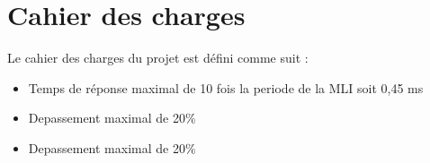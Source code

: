 \section{Cahier des charges}
Le cahier des charges du projet est défini comme suit :
\begin{itemize}
    \item Temps de réponse maximal de 10 fois la periode de la MLI soit 0,45 ms
    \item Depassement maximal de 20\%
\end{itemize}

\begin{itemize}
    \item Depassement maximal de 20\%
\end{itemize}
